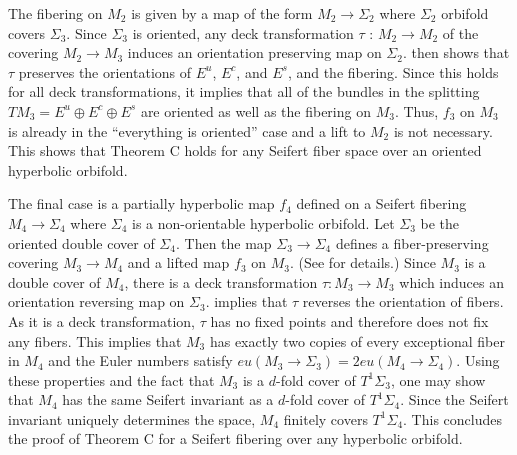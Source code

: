 \documentclass[11pt]{amsart} %
\newcommand{\Es}{E^s}
\newcommand{\Ec}{E^c}
\newcommand{\Eu}{E^u}
\newcommand{\Sig}{\Sigma}
\newcommand{\UTSig}{T^1 \Sig}
\numberwithin{equation}{section}
\theoremstyle{remark}
\begin{document}
The fibering on $M_2$ is given by a map of the form $M_2  \to  \Sig_2$
where $\Sig_2$ orbifold covers $\Sig_3$.
Since $\Sig_3$ is oriented,
any deck transformation $\tau$ : $M_2  \to  M_2$ of the covering 
$M_2  \to  M_3$ induces an orientation preserving map on $\Sig_2$.
 then shows that $\tau$ preserves the orientations
of $\Eu$, $\Ec$, and $\Es$, and the fibering.
Since this holds for all deck transformations, it implies that
all of the bundles in the splitting
$TM_3 = \Eu \oplus \Ec \oplus \Es$ are oriented as well as the fibering on $M_3$.
Thus, $f_3$ on $M_3$ is already in the ``everything is oriented'' case
and a lift to $M_2$ is not necessary.
This shows that Theorem C holds for any Seifert fiber space over an
oriented hyperbolic orbifold.

\medskip

The final case is a partially hyperbolic map $f_4$
defined on a Seifert fibering $M_4  \to  \Sig_4$ where
$\Sig_4$ is a non-orientable hyperbolic orbifold.
Let $\Sig_3$ be the oriented double cover of $\Sig_4$.
Then the map $\Sig_3  \to  \Sig_4$ defines a fiber-preserving covering
$M_3  \to  M_4$ and a lifted map $f_3$ on $M_3$.
(See \cite[Corollary 3.2]{jn1983lectures} for details.)
Since $M_3$ is a double cover of $M_4$,
there is a deck transformation $\tau : M_3 \to M_3$
which induces an orientation reversing map on $\Sig_3$.
 implies that $\tau$ reverses the orientation of fibers.
As it is a deck transformation, $\tau$ has no fixed points and therefore
does not fix any fibers.
This implies that $M_3$ has exactly two copies of every exceptional fiber
in $M_4$ and
the Euler numbers satisfy
\begin{math}
    eu(M_3 \to \Sig_3) = 2 eu(M_4 \to \Sig_4).
\end{math}
Using these properties and the fact that $M_3$ is a $d$-fold cover of $\UTSig_3$,
one may show that $M_4$ has the same Seifert invariant as
a $d$-fold cover of $\UTSig_4$.
Since the Seifert invariant uniquely determines the space,
$M_4$ finitely covers $\UTSig_4$.
This concludes the proof of Theorem C for a Seifert fibering over any
hyperbolic orbifold.

\bigskip
\end{document}
